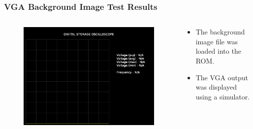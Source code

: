 \documentclass{beamer}
\begin{document}
\begin{frame}
\frametitle{VGA Background Image Test Results}

\begin{columns}[onlytextwidth]
  \begin{column}{0.5\linewidth}
  
  	\begin{figure}[!htb]
      \includegraphics[width=\linewidth]{vga_background_test_result.png}
	\end{figure}
    
  \end{column}
  \begin{column}{0.45\linewidth}
  
  	\begin{itemize}
      \item The background image file was loaded into the ROM.
      \item The VGA output was displayed using a simulator.
	\end{itemize}
    
  \end{column}
\end{columns}

\end{frame}
\end{document}

